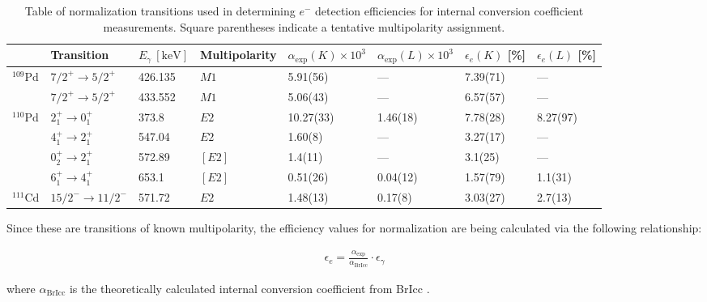 \begin{table}
  \begin{center}
    \begin{tabular}{|l|l l l|l l|l l|} 
     \hline
     & Transition & $E_\gamma \ [\mathrm{keV}]$ & Multipolarity & $\alpha_\mathrm{exp}(K) \times 10^3$ & $\alpha_\mathrm{exp}(L) \times 10^3$ &	$\epsilon_e (K)$ [\%]	& $\epsilon_e (L)$ [\%]\\  
     \hline
     $^{109}\mathrm{Pd}$	& $7/2^+ \rightarrow 5/2^+$	& 426.135	& $M1$	& 5.91(56)	& ---	& 7.39(71)	& --- \\
     						& $7/2^+ \rightarrow 5/2^+$	& 433.552	& $M1$	& 5.06(43)	& ---	& 6.57(57)	& --- \\
     $^{110}\mathrm{Pd}$	& $2_1^+ \rightarrow 0_1^+$ & 373.8  	& $E2$	& 10.27(33)	& 1.46(18)		& 7.78(28)	& 8.27(97)	  \\  
                         	& $4_1^+ \rightarrow 2_1^+$ & 547.04  	& $E2$	& 1.60(8)	& ---	& 3.27(17)	& ---  \\
                            & $0_2^+ \rightarrow 2_1^+$ & 572.89  	& $[E2]$& 1.4(11)	& ---	& 3.1(25)	& ---  \\
                            & $6_1^+ \rightarrow 4_1^+$ & 653.1  	& $[E2]$& 0.51(26)	& 0.04(12)		& 1.57(79)	& 1.1(31)	  \\  
     $^{111}\mathrm{Cd}$	& $15/2^- \rightarrow 11/2^-$ & 571.72 	& $E2$	& 1.48(13)	& 0.17(8)		& 3.03(27)	& 2.7(13)	  \\     
     \hline
    \end{tabular}
  \end{center}
  \caption[Table of normalization transitions used in determining $e^-$ detection efficiencies for internal conversion coefficient measurements.]{Table of normalization transitions used in determining $e^-$ detection efficiencies for internal conversion coefficient measurements. Square parentheses indicate a tentative multipolarity assignment.}
  \label{table:norm_icc}
\end{table}

Since these are transitions of known multipolarity, the efficiency values for normalization are being calculated via the following relationship:

\begin{gather}
\epsilon_e= \frac{\alpha_\mathrm{exp}}{\alpha_\mathrm{BrIcc}} \cdot \epsilon_\gamma
\label{equation: Electron efficiency normalization}
\end{gather}

where $\alpha_\mathrm{BrIcc}$ is the theoretically calculated internal conversion coefficient from BrIcc \cite{KIBEDI2008202}.

